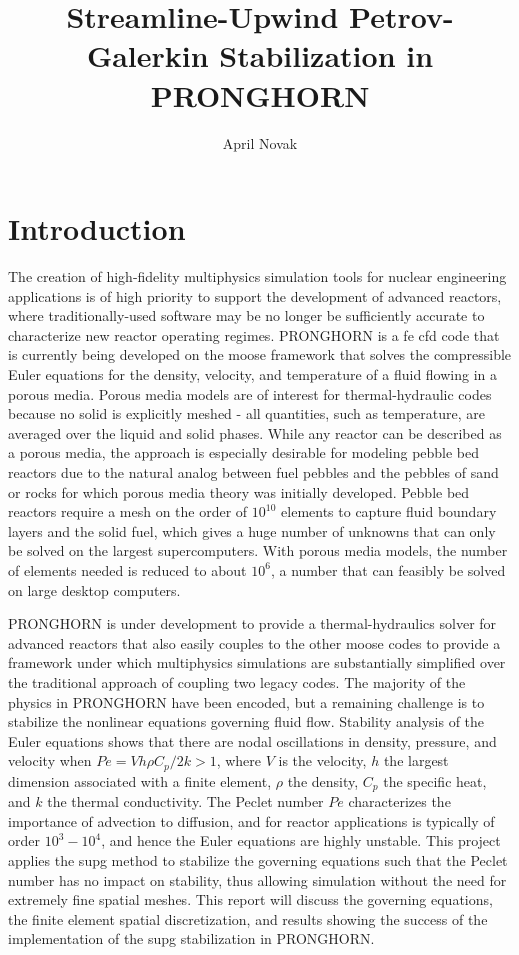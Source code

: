 \documentclass[10pt]{article}
\numberwithin{equation}{section} %
\begin{document}
\title{Streamline-Upwind Petrov-Galerkin Stabilization in PRONGHORN}
\author{April Novak}
\maketitle

\section{Introduction}

The creation of high-fidelity multiphysics simulation tools for nuclear engineering applications is of high priority to support the development of advanced reactors, where traditionally-used software may be no longer be sufficiently accurate to characterize new reactor operating regimes. PRONGHORN is a \gls{fe} \gls{cfd} code that is currently being developed on the \gls{moose} framework that solves the compressible Euler equations for the density, velocity, and temperature of a fluid flowing in a porous media. Porous media models are of interest for thermal-hydraulic codes because no solid is explicitly meshed - all quantities, such as temperature, are averaged over the liquid and solid phases. While any reactor can be described as a porous media, the approach is especially desirable for modeling pebble bed reactors due to the natural analog between fuel pebbles and the pebbles of sand or rocks for which porous media theory was initially developed. Pebble bed reactors require a mesh on the order of \(10^10\) elements to capture fluid boundary layers and the solid fuel, which gives a huge number of unknowns that can only be solved on the largest supercomputers. With porous media models, the number of elements needed is reduced to about \(10^6\), a number that can feasibly be solved on large desktop computers.

PRONGHORN is under development to provide a thermal-hydraulics solver for advanced reactors that also easily couples to the other
\gls{moose} codes to provide a framework under which multiphysics simulations are substantially simplified over the traditional approach of coupling two legacy codes. The majority of the physics in PRONGHORN have been encoded, but a remaining challenge is to stabilize the nonlinear equations governing fluid flow. Stability analysis of the Euler equations shows that there are nodal oscillations in density, pressure, and velocity when \(Pe=Vh\rho C_p/2k>1\), where \(V\) is the velocity, \(h\) the largest dimension associated with a finite element, \(\rho\) the density, \(C_p\) the specific heat, and \(k\) the thermal conductivity. The Peclet number \(Pe\) characterizes the importance of advection to diffusion, and for reactor applications is typically of order \(10^3-10^4\), and hence the Euler equations are highly unstable. This project applies the \gls{supg} method to stabilize the governing equations such that the Peclet number has no impact on stability, thus allowing simulation without the need for extremely fine spatial meshes. This report will discuss the governing equations, the finite element spatial discretization, and results showing the success of the implementation of the \gls{supg} stabilization in PRONGHORN. 
\end{document}
